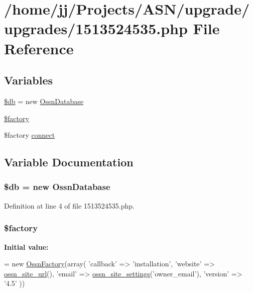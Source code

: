 \hypertarget{1513524535_8php}{}\section{/home/jj/\+Projects/\+A\+S\+N/upgrade/upgrades/1513524535.php File Reference}
\label{1513524535_8php}
\subsection*{Variables}
\begin{DoxyCompactItemize}
\item 
\hyperlink{1513524535_8php_a1fa3127fc82f96b1436d871ef02be319}{\$db} = new \hyperlink{class_ossn_database}{Ossn\+Database}
\item 
\hyperlink{1513524535_8php_a099b374dc664ee043fffcd6ea05e3e70}{\$factory}
\item 
\$factory \hyperlink{1513524535_8php_a3fdbedd7713e458f25fcf7dc1f562a3d}{connect}
\end{DoxyCompactItemize}


\subsection{Variable Documentation}
\subsubsection[{\texorpdfstring{\$db}{$db}}]{\setlength{\rightskip}{0pt plus 5cm}\$db = new {\bf Ossn\+Database}}\hypertarget{1513524535_8php_a1fa3127fc82f96b1436d871ef02be319}{}\label{1513524535_8php_a1fa3127fc82f96b1436d871ef02be319}


Definition at line 4 of file 1513524535.\+php.

\subsubsection[{\texorpdfstring{\$factory}{$factory}}]{\setlength{\rightskip}{0pt plus 5cm}\$factory}\hypertarget{1513524535_8php_a099b374dc664ee043fffcd6ea05e3e70}{}\label{1513524535_8php_a099b374dc664ee043fffcd6ea05e3e70}
{\bfseries Initial value\+:}
\begin{DoxyCode}
= \textcolor{keyword}{new} \hyperlink{class_ossn_factory}{OssnFactory}(array(
        \textcolor{stringliteral}{'callback'} => \textcolor{stringliteral}{'installation'},
        \textcolor{stringliteral}{'website'} => \hyperlink{ossn_8lib_8system_8php_a2f12f9244f99eccd1225afb76ef2ab65}{ossn\_site\_url}(),
        \textcolor{stringliteral}{'email'} => \hyperlink{ossn_8lib_8system_8php_a610e2045b8a86c09f777b4d82e24e34c}{ossn\_site\_settings}(\textcolor{stringliteral}{'owner\_email'}),
        \textcolor{stringliteral}{'version'} => \textcolor{stringliteral}{'4.5'}
))
\end{DoxyCode}


